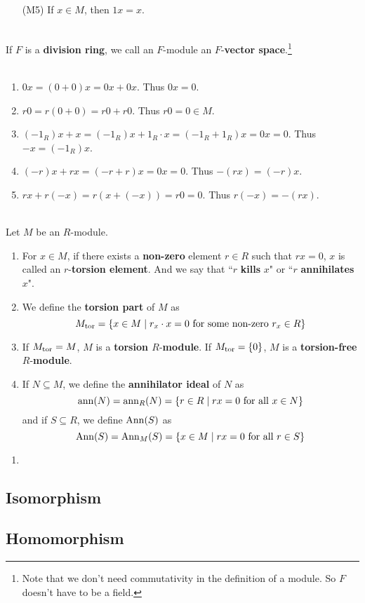 \begin{enumerate}
	\item[{\sffamily (M5)}] If $x\in M$, then $1x = x$.
\end{enumerate}~
\\
 If $F$ is a \textbf{division ring}, we call an $F$-module an $F$-\textbf{vector space}.\footnote{Note that we don't need commutativity in the definition of a module. So $F$ doesn't have to be a field.}\\
\\
\begin{enumerate}
	\item $0x = (0+0)x = 0x + 0x$. Thus $0x = 0$.
	\item $r0 = r(0+0) = r0 + r0$. Thus $r0 = 0\in M$.
	\item $(-1_R)x + x = (-1_R)x + 1_R\cdot x = (-1_R+1_R)x = 0x = 0$. Thus $-x = (-1_R)x$.
	\item $(-r)x + rx = (-r+r)x = 0x = 0$. Thus $-(rx) = (-r)x$.
	\item $rx + r(-x) = r(x + (-x)) = r0 = 0$. Thus $r(-x) = -(rx)$.
\end{enumerate}~
\\
 Let $M$ be an $R$-module.
\begin{enumerate}
	\item For $x\in M$, if there exists a \textbf{non-zero} element $r\in R$ such that $rx = 0$, $x$ is called an $r$-\textbf{torsion element}. And we say that ``$r$ \textbf{kills} $x$" or ``$r$ \textbf{annihilates} $x$".
	\item We define the \textbf{torsion part} of $M$ as $$M_{\text{tor}} = \{x\in M \mid r_x\cdot x = 0 \text{ for some non-zero } r_x\in R\}$$
	\item If $M_{\text{tor}} = M$, $M$ is a \textbf{torsion $R$}-\textbf{module}. If $M_{\text{tor}} = \{0\}$, $M$ is a \textbf{torsion-free $R$}-\textbf{module}.
	\item If $N\subseteq M$, we define the \textbf{annihilator ideal} of $N$ as
	$$\operatorname{ann}(N) = \operatorname{ann}_R(N) = \{r\in R\mid rx = 0 \text{ for all } x\in N\}$$
	and if $S\subseteq R$, we define $\operatorname{Ann}(S)$ as
	$$\operatorname{Ann}(S) = \operatorname{Ann}_M(S) = \{x\in M \mid rx = 0 \text{ for all }r\in S\}$$
\end{enumerate}
\begin{enumerate}
	\item 
\end{enumerate}

\subsection{Isomorphism}

\subsection{Homomorphism}